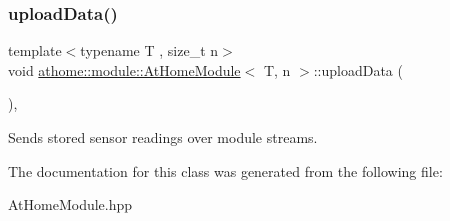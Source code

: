 \subsubsection{\texorpdfstring{upload\+Data()}{uploadData()}}
{\footnotesize\ttfamily template$<$typename T , size\+\_\+t n$>$ \\
void \mbox{\hyperlink{classathome_1_1module_1_1_at_home_module}{athome\+::module\+::\+At\+Home\+Module}}$<$ T, n $>$\+::upload\+Data (\begin{DoxyParamCaption}{ }\end{DoxyParamCaption})\hspace{0.3cm}{\ttfamily [inline]}, {\ttfamily [protected]}}

Sends stored sensor readings over module streams. 

The documentation for this class was generated from the following file\+:\begin{DoxyCompactItemize}
\item 
At\+Home\+Module.\+hpp\end{DoxyCompactItemize}
